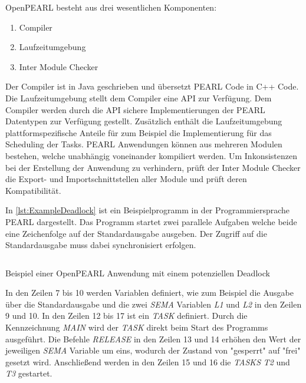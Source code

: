 OpenPEARL besteht aus drei wesentlichen Komponenten:
\begin{enumerate}
  \item Compiler
  \item Laufzeitumgebung
  \item Inter Module Checker
\end{enumerate}
Der Compiler ist in Java geschrieben und übersetzt PEARL Code in C++ Code. Die
Laufzeitumgebung stellt dem Compiler eine API zur Verfügung. Dem Compiler werden
durch die API sichere Implementierungen der PEARL Datentypen zur Verfügung
gestellt. Zusätzlich enthält die Laufzeitumgebung plattformspezifische Anteile
für zum Beispiel die Implementierung für das Scheduling der Tasks. PEARL
Anwendungen können aus mehreren Modulen bestehen, welche unabhängig voneinander
kompiliert werden. Um Inkonsistenzen bei der Erstellung der Anwendung zu
verhindern, prüft der Inter Module Checker die Export- und Importschnittstellen
aller Module und prüft deren Kompatibilität.

In \cref{lst:ExampleDeadlock} ist ein Beispielprogramm in der Programmiersprache
PEARL dargestellt. Das Programm startet zwei parallele Aufgaben welche beide
eine Zeichenfolge auf der Standardausgabe ausgeben. Der Zugriff auf die
Standardausgabe muss dabei synchronisiert erfolgen.
\begin{listing}[ht]
  \inputminted[frame=lines,linenos]{vim}{./Examples/Example_Deadlock.prl}
  \caption{Beispiel einer OpenPEARL Anwendung mit einem potenziellen Deadlock}
  \label{lst:ExampleDeadlock}   
\end{listing} 
In den Zeilen 7 bis 10 werden Variablen definiert, wie zum Beispiel die Ausgabe
über die Standardausgabe und die zwei \emph{SEMA} Variablen \emph{L1} und
\emph{L2} in den Zeilen 9 und 10. In den Zeilen 12 bis 17 ist ein \emph{TASK}
definiert. Durch die Kennzeichnung \emph{MAIN} wird der \emph{TASK} direkt beim
Start des Programms ausgeführt. Die Befehle \emph{RELEASE} in den Zeilen 13 und
14 erhöhen den Wert der jeweiligen \emph{SEMA} Variable um eins, wodurch der
Zustand von "gesperrt" auf "frei" gesetzt wird. Anschließend werden in den
Zeilen 15 und 16 die \emph{TASKS} \emph{T2} und \emph{T3} gestartet.

